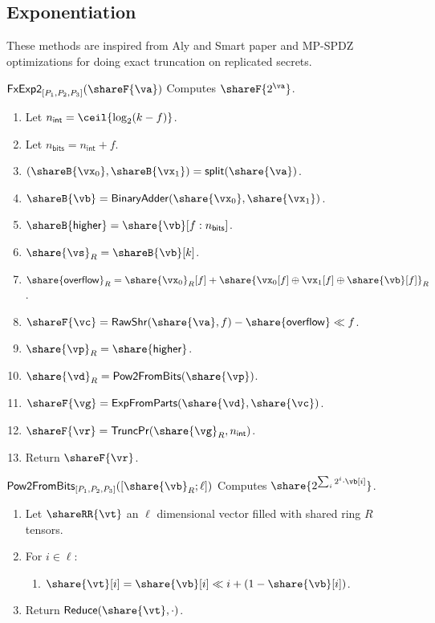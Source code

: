 \subsection{Exponentiation}
\label{subsec:exp}

These methods are inspired from Aly and Smart paper and MP-SPDZ optimizations
for doing exact truncation on replicated secrets.

\msubsubsection
  {$\mathsf{FxExp2}_{[P_1, P_2, P_3]}(\shareF{\va})$}
  Computes $\shareF{2^\va}$.
\begin{enumerate}
	\item Let $n_{\mathsf{int}} = \ceil{\log_2({k - f})}$.
	\item Let $n_{\mathsf{bits}} = n_{\mathsf{int}} + f$.
	\item $(\shareB{\vx_0}, \shareB{\vx_1}) = \mathsf{split}(\share{\va})$.
	\item $\shareB{\vb} = \mathsf{BinaryAdder}(\share{\vx_0}, \share{\vx_1})$.
	\item $\shareB{\mathsf{higher}} = \share{\vb}[f:n_\mathsf{bits}]$.
	\item $\share{\vs}_R = \shareB{\vb}[k]$.
	\item $\share{\mathsf{overflow}}_R = \share{\vx_0}_R[f] + \share{
	\vx_0[f] \oplus \vx_1[f] \oplus \share{\vb}[f]}_R$.
	\item $\shareF{\vc} = \mathsf{RawShr}(\share{\va}, f) - \share{\mathsf{overflow}} \ll f$.
	\item $\share{\vp}_R = \share{\mathsf{higher}}$.
	\item $\share{\vd}_R = \mathsf{Pow2FromBits}(\share{\vp})$.
	\item $\shareF{\vg} = \mathsf{ExpFromParts}(\share{\vd},\share{\vc})$.
	\item $\shareF{\vr} = \mathsf{TruncPr}(\share{\vg}_R, n_\mathsf{int})$.
	\item Return $\shareF{\vr}$.

\end{enumerate}


\msubsubsection
  {$\mathsf{Pow2FromBits}_{[P_1, P_2, P_3]}([\share{\vb}_R; \ell])$}
  Computes $\share{2^{\sum_i{2^i\cdot \vb[i]}}}$.
\begin{enumerate}
	\item Let $\shareRR{\vt}$ an $\ell$ dimensional vector filled with
	shared ring $R$ tensors.
	\item For $i \in \ell$:
	\begin{enumerate}
		\item $\share{\vt}[i] = \share{\vb}[i] \ll i + (1 - \share{\vb}[i])$.
	\end{enumerate}
	\item Return $\mathsf{Reduce}(\share{\vt}, \cdot)$.
\end{enumerate}


